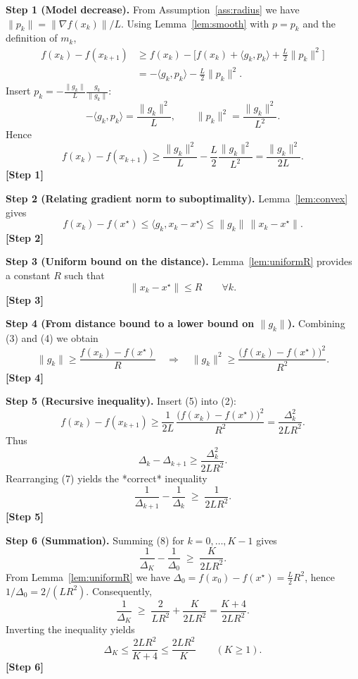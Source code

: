 \documentclass{article}
\begin{document}
\noindent\textbf{Step 1 (Model decrease).}  
From Assumption~\ref{ass:radius} we have $\|p_k\|=\|\nabla f(x_k)\|/L$. Using Lemma~\ref{lem:smooth} with $p=p_k$ and the definition of $m_k$,
\[
\begin{aligned}
f(x_k)-f(x_{k+1})
&\ge f(x_k)-\bigl[f(x_k)+\langle g_k,p_k\rangle+\tfrac{L}{2}\|p_k\|^{2}\bigr]   \\
&= -\langle g_k,p_k\rangle-\tfrac{L}{2}\|p_k\|^{2}.
\end{aligned}
\tag{1}
\]
Insert $p_k=-\frac{\|g_k\|}{L}\frac{g_k}{\|g_k\|}$:
\[
-\langle g_k,p_k\rangle = \frac{\|g_k\|^{2}}{L},
\qquad
\|p_k\|^{2}= \frac{\|g_k\|^{2}}{L^{2}} .
\]
Hence
\[
f(x_k)-f(x_{k+1})\ge \frac{\|g_k\|^{2}}{L}-\frac{L}{2}\frac{\|g_k\|^{2}}{L^{2}}
= \frac{\|g_k\|^{2}}{2L}. \tag{2}
\]
\noindent\textbf{[Step 1]}

\noindent\textbf{Step 2 (Relating gradient norm to suboptimality).}  
Lemma~\ref{lem:convex} gives
\[
f(x_k)-f(x^\star)\le\langle g_k,x_k-x^\star\rangle
\le\|g_k\|\,\|x_k-x^\star\| . \tag{3}
\]
\noindent\textbf{[Step 2]}

\noindent\textbf{Step 3 (Uniform bound on the distance).}  
Lemma~\ref{lem:uniformR} provides a constant $R$ such that
\[
\|x_k-x^\star\|\le R\qquad\forall k. \tag{4}
\]
\noindent\textbf{[Step 3]}

\noindent\textbf{Step 4 (From distance bound to a lower bound on $\|g_k\|$).}  
Combining (3) and (4) we obtain
\[
\|g_k\|\ge\frac{f(x_k)-f(x^\star)}{R}
\quad\Longrightarrow\quad
\|g_k\|^{2}\ge\frac{\bigl(f(x_k)-f(x^\star)\bigr)^{2}}{R^{2}} . \tag{5}
\]
\noindent\textbf{[Step 4]}

\noindent\textbf{Step 5 (Recursive inequality).}  
Insert (5) into (2):
\[
f(x_k)-f(x_{k+1})
\ge \frac{1}{2L}\,\frac{\bigl(f(x_k)-f(x^\star)\bigr)^{2}}{R^{2}}
= \frac{\Delta_k^{2}}{2L R^{2}} . \tag{6}
\]
Thus
\[
\Delta_k-\Delta_{k+1}\ge\frac{\Delta_k^{2}}{2L R^{2}} . \tag{7}
\]
Rearranging (7) yields the *correct* inequality
\[
\frac{1}{\Delta_{k+1}}-\frac{1}{\Delta_{k}}
\;\ge\;\frac{1}{2L R^{2}} . \tag{8}
\]
\noindent\textbf{[Step 5]}

\noindent\textbf{Step 6 (Summation).}  
Summing (8) for $k=0,\dots,K-1$ gives
\[
\frac{1}{\Delta_{K}}-\frac{1}{\Delta_{0}}
\;\ge\;\frac{K}{2L R^{2}} .
\]
From Lemma~\ref{lem:uniformR} we have $\Delta_{0}=f(x_0)-f(x^\star)=\frac{L}{2}R^{2}$, hence $1/\Delta_{0}=2/(L R^{2})$. Consequently,
\[
\frac{1}{\Delta_{K}}\;\ge\;\frac{2}{L R^{2}}+\frac{K}{2L R^{2}}
=\frac{K+4}{2L R^{2}} .
\]
Inverting the inequality yields
\[
\Delta_{K}\le\frac{2L R^{2}}{K+4}\le\frac{2L R^{2}}{K}\qquad(K\ge1). \tag{9}
\]
\noindent\textbf{[Step 6]}
\end{document}
